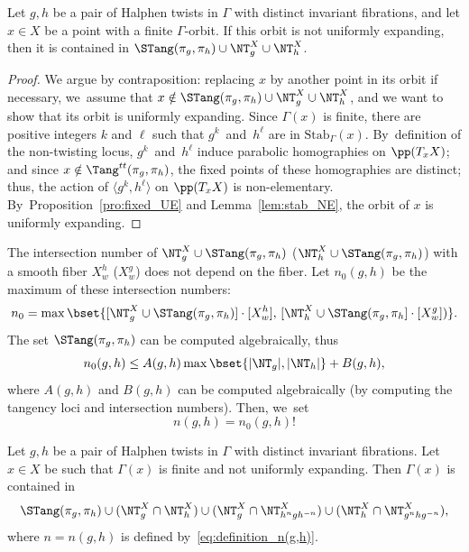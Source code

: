 \begin{lem}\label{lem:NT1}
Let $g,h$ be a pair of Halphen twists in $\Gamma$ with distinct invariant fibrations, and let $x\in X$ be a point with a finite $\Gamma$-orbit.
If this orbit is not uniformly expanding, then
it is contained in
$ \STang(\pi_g, \pi_h)\cup \NT_g^X\cup \NT_h^X$.
\end{lem}

\begin{proof}
We argue by contraposition: replacing $x$ by another point in its orbit if necessary, we~assume that $x\notin \STang(\pi_g, \pi_h)\cup \NT_g^X\cup \NT_h^X$, and we want to show that its orbit is
uniformly expanding.
Since $\Gamma(x)$ is finite, there are positive integers $k$ and $\ell$
such that $g^k$~and~$h^\ell$ are in $\mathrm{Stab}_\Gamma(x)$. By~definition of the non-twisting locus,
$g^k$~and~$h^\ell$
induce parabolic homographies on $\pp(T_xX)$; and since $x\notin \Tang^{tt}(\pi_g,\pi_h)$, the
fixed points of these homographies are distinct; thus, the action of
$\langle g^k, h^\ell\rangle$ on $\pp(T_xX)$ is non-elementary. By~Proposition~\ref{pro:fixed_UE} and Lemma~\ref{lem:stab_NE}, the orbit of $x$ is uniformly expanding. \end{proof}

The intersection number of $\NT_g^X \cup \STang(\pi_g, \pi_h)$ (\resp $\NT_h^X \cup \STang(\pi_g, \pi_h)$) with a smooth fiber $X_w^h$ (\resp $X_w^g$) does not depend on the fiber. Let $n_0(g,h)$ be the maximum of these intersection numbers:
\begin{equation}\label{eq:definition_n0}
n_0=\max\bset{[\NT_g^X \cup \STang(\pi_g, \pi_h)] \cdot [X_w^h],\,  [\NT_h^X \cup \STang(\pi_g, \pi_h]\cdot [X_w^g])}.
\end{equation}
The set $\STang(\pi_g, \pi_h)$ can be computed algebraically, thus
\begin{equation*}
n_0(g,h)\leq A(g,h) \max\bset{\vert \NT_g\vert, \vert \NT_h\vert} + B(g,h),
\end{equation*}
where $A(g,h)$ and $B(g,h)$ can be computed algebraically (by computing the tangency loci and intersection numbers).
Then, we~set
\begin{equation}\label{eq:definition_n(g,h)}
n(g,h)=n_0(g,h) !
\end{equation}

\begin{lem}\label{lem:definition_of_bad(g,h)}
Let $g,h$ be a pair of Halphen twists in $\Gamma$ with distinct invariant fibrations. Let
$x\in X$ be such that $\Gamma(x)$ is finite and not
uniformly expanding. Then $\Gamma(x)$ is contained in
\[
\STang(\pi_g, \pi_h) \cup
(\NT_g^X\cap \NT_h^X)\cup (\NT_g^X\cap \NT_{h^n gh^{-n}}^X) \cup (\NT_h^X\cap \NT_{g^nhg^{-n}}^X),
\]
where $n=n(g,h)$ is defined by~\eqref{eq:definition_n(g,h)}.
\end{lem}

